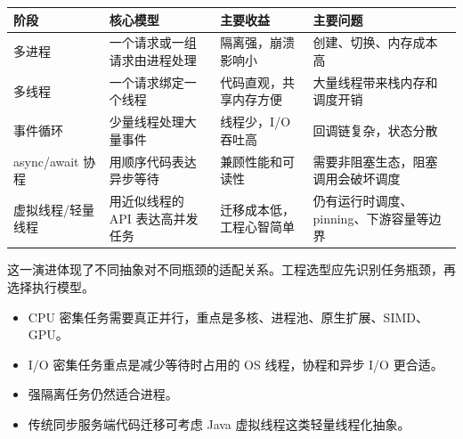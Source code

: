 \documentclass[
  11pt,
  a4paper,
]{article}
\newcounter{none} %
\providecommand{\tightlist}{%
  \setlength{\itemsep}{0pt}\setlength{\parskip}{0pt}}
\begin{document}
{\def\LTcaptype{none} %
\begin{longtable}[]{@{}
  >{\raggedright\arraybackslash}p{}
  >{\raggedright\arraybackslash}p{}
  >{\raggedright\arraybackslash}p{}
  >{\raggedright\arraybackslash}p{}@{}}
\toprule\noalign{}
\begin{minipage}[b]{\linewidth}\raggedright
阶段
\end{minipage} & \begin{minipage}[b]{\linewidth}\raggedright
核心模型
\end{minipage} & \begin{minipage}[b]{\linewidth}\raggedright
主要收益
\end{minipage} & \begin{minipage}[b]{\linewidth}\raggedright
主要问题
\end{minipage} \\
\midrule\noalign{}
\endhead
\bottomrule\noalign{}
\endlastfoot
多进程 & 一个请求或一组请求由进程处理 & 隔离强，崩溃影响小 &
创建、切换、内存成本高 \\
多线程 & 一个请求绑定一个线程 & 代码直观，共享内存方便 &
大量线程带来栈内存和调度开销 \\
事件循环 & 少量线程处理大量事件 & 线程少，I/O 吞吐高 &
回调链复杂，状态分散 \\
async/await 协程 & 用顺序代码表达异步等待 & 兼顾性能和可读性 &
需要非阻塞生态，阻塞调用会破坏调度 \\
虚拟线程/轻量线程 & 用近似线程的 API 表达高并发任务 &
迁移成本低，工程心智简单 & 仍有运行时调度、pinning、下游容量等边界 \\
\end{longtable}
}

这一演进体现了不同抽象对不同瓶颈的适配关系。工程选型应先识别任务瓶颈，再选择执行模型。

\begin{itemize}
\tightlist
\item
  CPU 密集任务需要真正并行，重点是多核、进程池、原生扩展、SIMD、GPU。
\item
  I/O 密集任务重点是减少等待时占用的 OS 线程，协程和异步 I/O 更合适。
\item
  强隔离任务仍然适合进程。
\item
  传统同步服务端代码迁移可考虑 Java 虚拟线程这类轻量线程化抽象。
\end{itemize}
\end{document}
